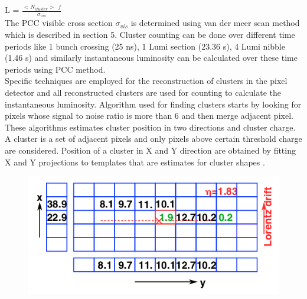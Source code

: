 L = $\frac{<N_{cluster}> \:\: f}{\sigma_{vis}}$ \\

The PCC visible cross section $\sigma_{vis}$ is determined using van der meer scan method which is described in section 5. Cluster counting can be done over different time periods like 1 bunch crossing (25 ns), 1 Lumi section (23.36 s), 4 Lumi nibble (1.46 s) and similarly instantaneous luminosity can be calculated over these time periods using PCC method. \\

Specific techniques are employed for the reconstruction of clusters in the pixel detector and all reconstructed clusters are used for counting to calculate the instantaneous luminosity. Algorithm used for finding clusters starts by looking for pixels whose signal to noise ratio is more than 6 and then merge adjacent pixel. These algorithms estimates cluster position in two directions and cluster charge. A cluster is a set of adjacent pixels and only pixels above certain threshold charge are considered. Position of a cluster in X and Y direction are obtained by fitting X and Y projections to templates that are estimates for cluster shapes \cite{Chatrchyan:2014fea}.


\begin{figure}[H]
  \centering
  \includegraphics[width=0.6\columnwidth]{./pixel_reco.png}
  \caption{ \onehalfspacing }
  \label{fig:CMS}
\end{figure}








